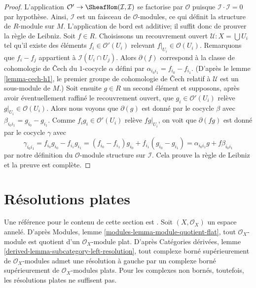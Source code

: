 \begin{proof}

L'application $\mathcal{O}' \to \SheafHom(\mathcal{I}, \mathcal{I})$
se factorise par $\mathcal{O}$ puisque $\mathcal{I} \cdot \mathcal{I} = 0$
par hypothèse. Ainsi, $\mathcal{I}$ est un faisceau de $\mathcal{O}$-modules, ce qui définit la structure de $R$-module sur $M$. L'application de bord est additive; il suffit donc de prouver la règle de Leibniz. Soit $f \in R$. Choisissons un recouvrement ouvert
$\mathcal{U} : X = \bigcup U_i$ tel qu'il existe des éléments
$f_i \in \mathcal{O}'(U_i)$ relevant $f|_{U_i} \in \mathcal{O}(U_i)$. Remarquons que $f_i - f_j$ appartient à $\mathcal{I}(U_i \cap U_j)$. Alors $\partial(f)$ correspond à la classe de cohomologie de {\v C}ech du $1$-cocycle $\alpha$ défini par $\alpha_{i_0i_1} = f_{i_0} - f_{i_1}$. (D'après le lemme \ref{lemma-cech-h1}, le premier groupe de cohomologie de {\v C}ech relatif à $\mathcal{U}$ est un sous-module de $M$.) Soit ensuite $g \in R$ un second élément et supposons, après avoir éventuellement raffiné le recouvrement ouvert, que $g_i \in \mathcal{O}'(U_i)$ relève
$g|_{U_i} \in \mathcal{O}(U_i)$. Alors nous voyons que
$\partial(g)$ est donné par le cocycle $\beta$ avec
$\beta_{i_0i_1} = g_{i_0} - g_{i_1}$. Comme $f_ig_i \in \mathcal{O}'(U_i)$
relève $fg|_{U_i}$, on voit que
$\partial(fg)$ est donné par le cocycle $\gamma$ avec
$$
\gamma_{i_0i_1} = f_{i_0}g_{i_0} - f_{i_1}g_{i_1} =
(f_{i_0} - f_{i_1})g_{i_0} + f_{i_1}(g_{i_0} - g_{i_1}) =
\alpha_{i_0i_1}g + f\beta_{i_0i_1}
$$
par notre définition du $\mathcal{O}$-module structure sur $\mathcal{I}$. Cela prouve la règle de Leibniz et la preuve est complète.

\end{proof}









\section{Résolutions plates}

\label{section-flat}

\noindent
Une référence pour le contenu de cette section est \cite{Spaltenstein}. Soit $(X, \mathcal{O}_X)$ un espace annelé. D'après Modules, lemme \ref{modules-lemma-module-quotient-flat}, tout $\mathcal{O}_X$-module est quotient d'un $\mathcal{O}_X$-module plat. D'après Catégories dérivées, lemme \ref{derived-lemma-subcategory-left-resolution}, tout complexe borné supérieurement de $\mathcal{O}_X$-modules admet une résolution à gauche par un complexe borné supérieurement de $\mathcal{O}_X$-modules plats. Pour les complexes non bornés, toutefois, les résolutions plates ne suffisent pas.

